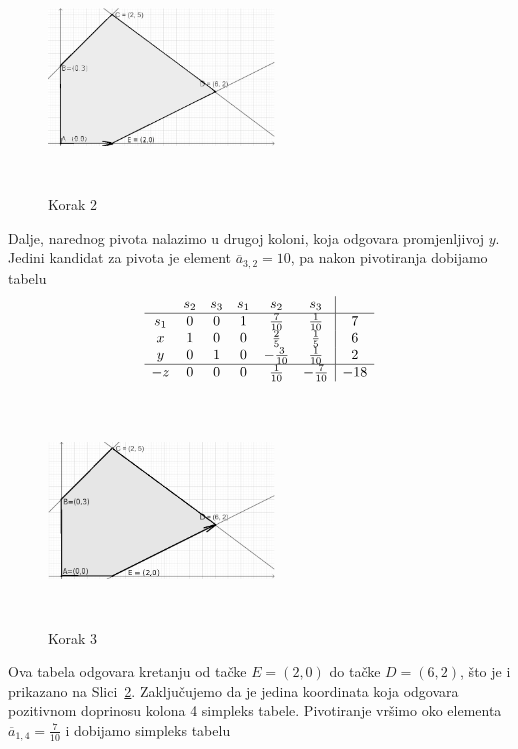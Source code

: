 \documentclass[b5paper, utf8, 11pt, colorlinks]{book}
\theoremstyle{definition}
\begin{document}
\begin{figure}[!ht]
	\centering
	\includegraphics[width=170pt, height=170pt]{simpleks-primjer-2-sl2.eps}
	\caption{Korak 2}
	\label{fig:step-2}
\end{figure}
Dalje, narednog pivota nalazimo u drugoj koloni, koja odgovara promjenljivoj $y$. Jedini kandidat za pivota je element $\overline{a}_{3, 2}= 10$, pa nakon pivotiranja dobijamo tabelu 
$$\begin{array}{cccccc| c}
	& s_2  & s_3   & s_1  & s_2 & s_3 &     \\ \hline
	s_1 & 0    &  0    & 1    &  \frac{7}{10}  & \frac{1}{10} &   7  \\  
	x   & 1    &  0    & 0    &  \frac{2}{5}   & \frac{1}{5}  &   6  \\
	y   & 0    &  1    & 0    & - \frac{3}{10}  & \frac{1}{10} &   2  \\ \hline
	-z  & 0    &  0    & 0    &   \frac{1}{10} &-\frac{7}{10}  &  -18 \\ 
\end{array}
$$ 

\begin{figure}[H]
	\centering
	\includegraphics[width=170pt, height=170pt]{simpleks-primjer-2-sl3.eps}
	\caption{Korak 3}
	\label{fig:step-3}
\end{figure}

Ova tabela odgovara kretanju od tačke $E=(2,0)$ do tačke $D=(6,2)$, što je i prikazano na Slici~\ref{fig:step-3}.
Zaključujemo da je jedina koordinata koja odgovara pozitivnom doprinosu kolona 
4 simpleks tabele. Pivotiranje vršimo oko elementa $\overline{a}_{1,4} = \frac{7}{10}$ i  dobijamo simpleks tabelu 
\end{document}
